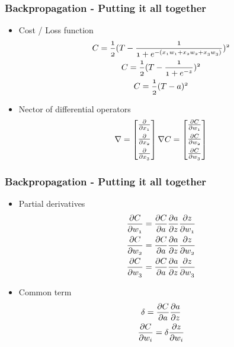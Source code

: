 \documentclass{beamer}
\newcommand{\var}[1]{\mathnormal{#1}}
\begin{document}
\begin{frame}
  \frametitle{Backpropagation - Putting it all together}
  \begin{itemize}
    \item Cost / Loss function
      \begin{gather}
        \var{C = \frac{1}{2} (T - \frac{1}{1 + e^{-(x_1 w_1 + x_2 w_2 + x_3 w_3)}})^2} \\
        \var{C = \frac{1}{2} (T - \frac{1}{1 + e^{-z}})^2} \\
        \var{C = \frac{1}{2} (T - a)^2}
      \end{gather}
    \item Nector of differential operators
      \[
        \nabla =
          \begin{bmatrix}
            \var{\frac{\partial{}}{\partial x_1}} \\[0.5em]
            \var{\frac{\partial{}}{\partial x_2}} \\[0.5em]
            \var{\frac{\partial{}}{\partial x_3}}
          \end{bmatrix}
        \nabla C =
          \begin{bmatrix}
            \var{\frac{\partial{C}}{\partial w_1}} \\[0.5em]
            \var{\frac{\partial{C}}{\partial w_2}} \\[0.5em]
            \var{\frac{\partial{C}}{\partial w_3}}
          \end{bmatrix}
      \]
  \end{itemize}
\end{frame}

\begin{frame}
  \frametitle{Backpropagation - Putting it all together}
  \begin{itemize}
    \item Partial derivatives
      \begin{gather}
        \var{\frac{\partial C}{\partial w_1} = \frac{\partial C}{\partial a}\frac{\partial a}{\partial z}\frac{\partial z}{\partial w_1}} \\
        \var{\frac{\partial C}{\partial w_2} = \frac{\partial C}{\partial a}\frac{\partial a}{\partial z}\frac{\partial z}{\partial w_2}} \\
        \var{\frac{\partial C}{\partial w_3} = \frac{\partial C}{\partial a}\frac{\partial a}{\partial z}\frac{\partial z}{\partial w_3}}
      \end{gather}
   \item Common term
     \begin{gather}
       \var{\delta = \frac{\partial C}{\partial a}\frac{\partial a}{\partial z}} \\
       \var{\frac{\partial C}{\partial w_i} = \delta \frac{\partial z}{\partial w_i}}
     \end{gather}
  \end{itemize}
\end{frame}
\end{document}
